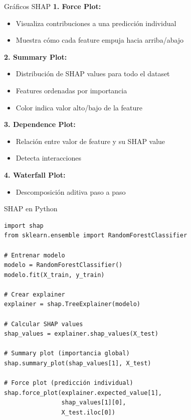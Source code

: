 \documentclass[aspectratio=169]{beamer}
\begin{document}
\begin{frame}{Gráficos SHAP}
\textbf{1. Force Plot:}
\begin{itemize}
\item Visualiza contribuciones a una predicción individual
\item Muestra cómo cada feature empuja hacia arriba/abajo
\end{itemize}

\vspace{0.2cm}

\textbf{2. Summary Plot:}
\begin{itemize}
\item Distribución de SHAP values para todo el dataset
\item Features ordenadas por importancia
\item Color indica valor alto/bajo de la feature
\end{itemize}

\vspace{0.2cm}

\textbf{3. Dependence Plot:}
\begin{itemize}
\item Relación entre valor de feature y su SHAP value
\item Detecta interacciones
\end{itemize}

\vspace{0.2cm}

\textbf{4. Waterfall Plot:}
\begin{itemize}
\item Descomposición aditiva paso a paso
\end{itemize}
\end{frame}

\begin{frame}[fragile]{SHAP en Python}
\small
\begin{verbatim}
import shap
from sklearn.ensemble import RandomForestClassifier

# Entrenar modelo
modelo = RandomForestClassifier()
modelo.fit(X_train, y_train)

# Crear explainer
explainer = shap.TreeExplainer(modelo)

# Calcular SHAP values
shap_values = explainer.shap_values(X_test)

# Summary plot (importancia global)
shap.summary_plot(shap_values[1], X_test)

# Force plot (predicción individual)
shap.force_plot(explainer.expected_value[1], 
                shap_values[1][0], 
                X_test.iloc[0])
\end{verbatim}
\end{frame}
\end{document}
